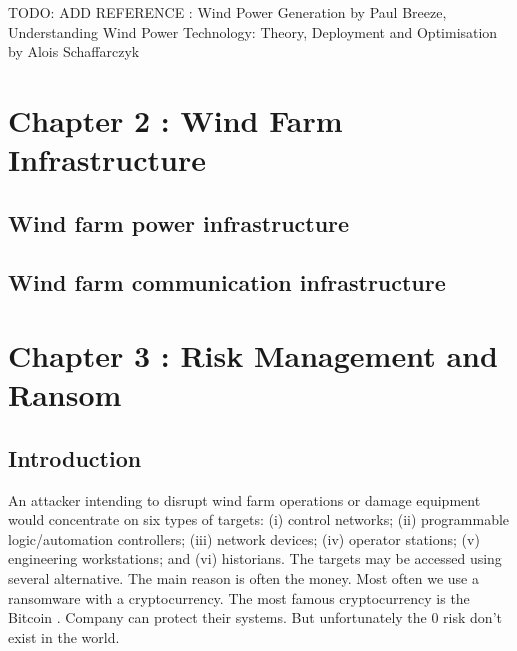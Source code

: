 \documentclass[twosided,a4,10pt]{article}
\begin{document}
\begin{multicols}{2}
\begin{description}
TODO: ADD REFERENCE : Wind Power Generation by Paul Breeze, Understanding Wind Power Technology: Theory, Deployment and Optimisation by Alois Schaffarczyk 
\end{description}

\section{Chapter 2 : Wind Farm Infrastructure }
 \subsection{Wind farm power infrastructure}
 \lipsum[1]
 \subsection{Wind farm communication infrastructure}
 \lipsum[1]
 
 
\section{Chapter 3 : Risk Management and Ransom } 
\subsection{Introduction}
An attacker intending to disrupt wind farm operations or damage equipment would concentrate on six types of targets: (i) control networks; (ii) programmable logic/automation controllers; (iii) network devices; (iv) operator stations; (v) engineering workstations; and (vi) historians. The targets may be accessed using several alternative. The main reason is often the money. Most often we use a ransomware with a cryptocurrency. The most famous cryptocurrency is the Bitcoin . Company can protect their systems. But unfortunately the 0 risk don't exist in the world.


\end{multicols}
\end{document}
